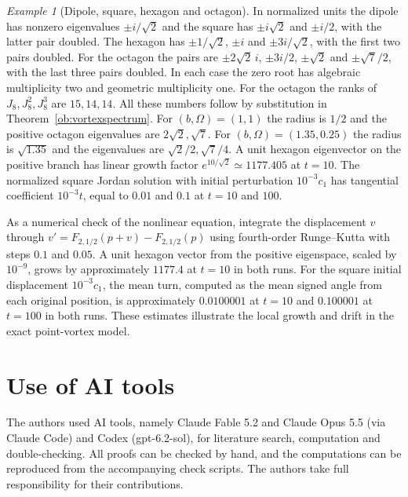 \documentclass[aps,pra,onecolumn,superscriptaddress,nofootinbib,10pt]{revtex4-2}
\theoremstyle{definition}
\theoremstyle{remark}
\newtheorem{example}[theorem]{Example}
\begin{document}
\begin{example}[Dipole, square, hexagon and octagon]
\label{ob:vortexnumbers}
In normalized units the dipole has nonzero eigenvalues $\pm i/\sqrt{2}$
and the square has $\pm i\sqrt{2}$ and $\pm i/2$, with the latter pair
doubled. The hexagon has $\pm1/\sqrt{2}$, $\pm i$ and $\pm3i/\sqrt{2}$,
with the first two pairs doubled. For the octagon the pairs are
$\pm 2\sqrt{2}\,i$, $\pm 3i/2$, $\pm\sqrt{2}$ and $\pm\sqrt{7}/2$,
with the last three pairs doubled. In each case the zero root has
algebraic multiplicity two and geometric multiplicity one.
For the octagon the ranks of $J_8,J_8^2,J_8^3$ are $15,14,14$.
All these numbers follow by substitution in Theorem~\ref{ob:vortexspectrum}.
For $(b,\Omega)=(1,1)$ the radius is $1/2$ and the positive octagon
eigenvalues are $2\sqrt{2},\sqrt{7}$. For $(b,\Omega)=(1.35,0.25)$ the
radius is $\sqrt{1.35}$ and the eigenvalues are $\sqrt{2}/2,\sqrt{7}/4$.
A unit hexagon eigenvector on the positive branch has linear growth
factor $e^{10/\sqrt{2}}\simeq1177.405$ at $t=10$. The normalized
square Jordan solution with initial perturbation $10^{-3}c_1$
has tangential coefficient $10^{-3}t$, equal to $0.01$ and $0.1$
at $t=10$ and $100$.

As a numerical check of the nonlinear equation, integrate the displacement
$v$ through $v'=F_{2,1/2}(p+v)-F_{2,1/2}(p)$ using fourth-order
Runge--Kutta with steps $0.1$ and $0.05$. A unit hexagon vector from the
positive eigenspace, scaled by $10^{-9}$, grows by approximately $1177.4$
at $t=10$ in both runs. For the square initial displacement $10^{-3}c_1$,
the mean turn, computed as the mean signed angle from each original
position, is approximately $0.0100001$ at $t=10$ and $0.100001$
at $t=100$ in both runs. These estimates illustrate the local growth and
drift in the exact point-vortex model.
\end{example}


\section*{Use of AI tools}
The authors used AI tools, namely Claude Fable 5.2 and Claude Opus 5.5 (via Claude Code) and Codex (gpt-6.2-sol), for literature
search, computation and double-checking.  All proofs can be checked by hand, and the computations can be
reproduced from the accompanying check scripts.  The authors take full responsibility for their
contributions.
\end{document}
